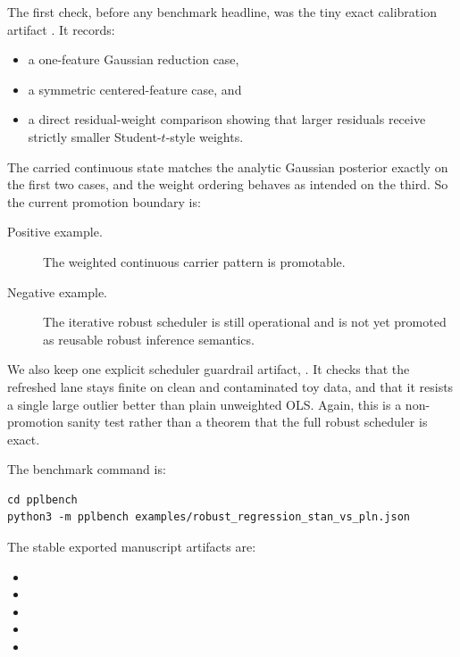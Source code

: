 \documentclass[11pt,openany]{report}
\begin{document}
The first check, before any benchmark headline, was the tiny exact calibration
artifact .
It records:
\begin{itemize}
\item a one-feature Gaussian reduction case,
\item a symmetric centered-feature case, and
\item a direct residual-weight comparison showing that larger residuals receive
strictly smaller Student-\(t\)-style weights.
\end{itemize}
The carried continuous state matches the analytic Gaussian posterior exactly on
the first two cases, and the weight ordering behaves as intended on the third.
So the current promotion boundary is:
\begin{description}
\item[Positive example.] The weighted continuous carrier pattern is promotable.
\item[Negative example.] The iterative robust scheduler is still operational and
is not yet promoted as reusable robust inference semantics.
\end{description}

We also keep one explicit scheduler guardrail artifact,
.  It
checks that the refreshed lane stays finite on clean and contaminated toy data,
and that it resists a single large outlier better than plain unweighted OLS.
Again, this is a non-promotion sanity test rather than a theorem that the full
robust scheduler is exact.

The benchmark command is:
\begin{lstlisting}
cd pplbench
python3 -m pplbench examples/robust_regression_stan_vs_pln.json
\end{lstlisting}

The stable exported manuscript artifacts are:
\begin{itemize}
\item {}
\item {}
\item {}
\item {}
\item {}
\end{itemize}
\end{document}
